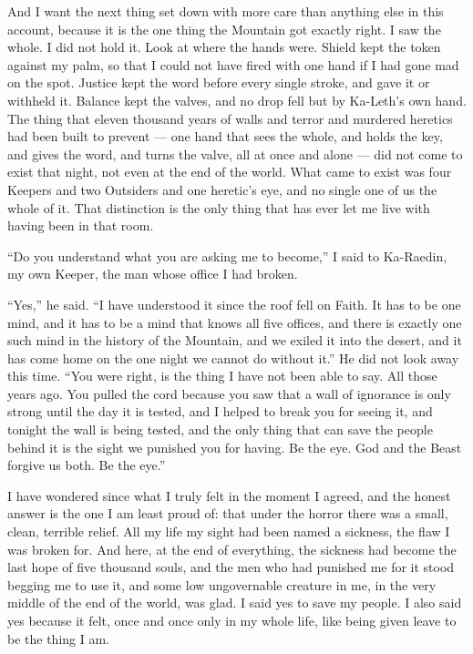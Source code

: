And I want the next thing set down with more care than anything else in this account, because it is the one thing the Mountain got exactly right. I saw the whole. I did not hold it. Look at where the hands were. Shield kept the token against my palm, so that I could not have fired with one hand if I had gone mad on the spot. Justice kept the word before every single stroke, and gave it or withheld it. Balance kept the valves, and no drop fell but by Ka-Leth's own hand. The thing that eleven thousand years of walls and terror and murdered heretics had been built to prevent --- one hand that sees the whole, and holds the key, and gives the word, and turns the valve, all at once and alone --- did not come to exist that night, not even at the end of the world. What came to exist was four Keepers and two Outsiders and one heretic's eye, and no single one of us the whole of it. That distinction is the only thing that has ever let me live with having been in that room.\par

``Do you understand what you are asking me to become,'' I said to Ka-Raedin, my own Keeper, the man whose office I had broken.\par

``Yes,'' he said. ``I have understood it since the roof fell on Faith. It has to be one mind, and it has to be a mind that knows all five offices, and there is exactly one such mind in the history of the Mountain, and we exiled it into the desert, and it has come home on the one night we cannot do without it.'' He did not look away this time. ``You were right, is the thing I have not been able to say. All those years ago. You pulled the cord because you saw that a wall of ignorance is only strong until the day it is tested, and I helped to break you for seeing it, and tonight the wall is being tested, and the only thing that can save the people behind it is the sight we punished you for having. Be the eye. God and the Beast forgive us both. Be the eye.''\par

I have wondered since what I truly felt in the moment I agreed, and the honest answer is the one I am least proud of: that under the horror there was a small, clean, terrible relief. All my life my sight had been named a sickness, the flaw I was broken for. And here, at the end of everything, the sickness had become the last hope of five thousand souls, and the men who had punished me for it stood begging me to use it, and some low ungovernable creature in me, in the very middle of the end of the world, was glad. I said yes to save my people. I also said yes because it felt, once and once only in my whole life, like being given leave to be the thing I am.\par


